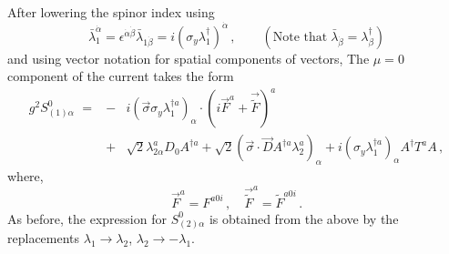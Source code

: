 After lowering the spinor index using   
$$
\bar{\lambda}^{\dot{\alpha}}_{1}=\epsilon^{\dot{\alpha}\dot{\beta}}
\bar\lambda_{1\dot\beta}=i(\sigma_y\lambda^\dagger_1)^{\dot\alpha}\,,
\qquad(\mbox{Note that}\;\bar\lambda_{\dot\beta}=\lambda^\dagger_\beta) 
$$
and using vector notation for spatial components of vectors, 
The $\mu=0$ component of the current takes the form 
\begin{eqnarray}
g^2S^0_{(1)\alpha}\,\,=&-&i(\vec{\sigma}\sigma_y\lambda^{\dagger a}_1)_\alpha
\cdot (i\vec{F}^a+\vec{\widetilde F})^a \nonumber\\
&+& \sqrt{2} \lambda^a_{2\alpha} D_0 A^{\dagger a} +
\sqrt{2}(\vec{\sigma}\cdot\vec{D}A^{\dagger a}\lambda^a_{2})_\alpha 
+i(\sigma_y\lambda^{\dagger a}_1)_\alpha A^\dagger T^a A\,, \nonumber
\end{eqnarray}
where,
$$
\vec{F}^a=F^{a 0i}\,,\quad \vec{\widetilde F}^a=\widetilde F^{a0i}\,.
$$
As before, the expression for $S^0_{(2)\alpha}$ is obtained from the
above by the replacements $\lambda_1\rightarrow\lambda_2$, $\lambda_2
\rightarrow-\lambda_1$.

